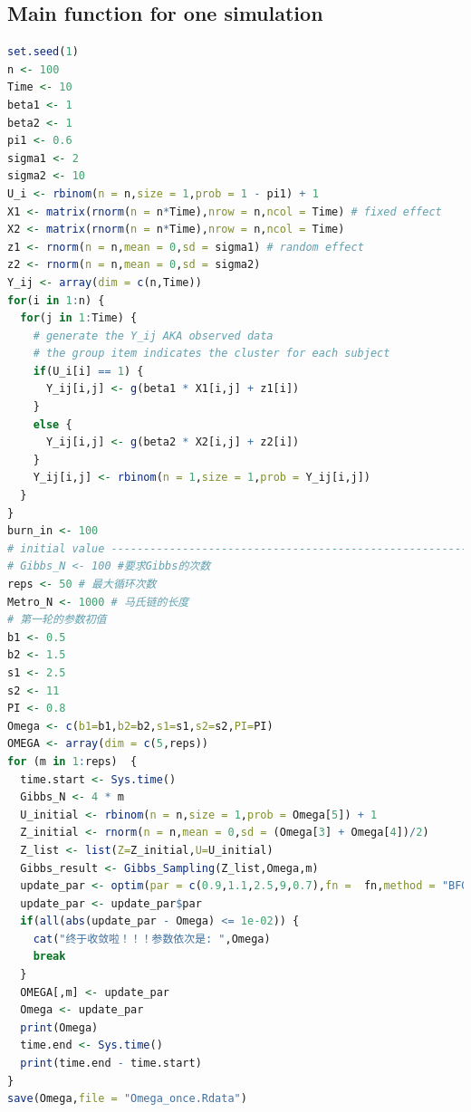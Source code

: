 \documentclass[11pt]{article}
\begin{document}
\subsection{Main function for one simulation}
  \begin{lstlisting}[language=R] 
set.seed(1)
n <- 100
Time <- 10
beta1 <- 1
beta2 <- 1
pi1 <- 0.6
sigma1 <- 2
sigma2 <- 10
U_i <- rbinom(n = n,size = 1,prob = 1 - pi1) + 1
X1 <- matrix(rnorm(n = n*Time),nrow = n,ncol = Time) # fixed effect
X2 <- matrix(rnorm(n = n*Time),nrow = n,ncol = Time)
z1 <- rnorm(n = n,mean = 0,sd = sigma1) # random effect
z2 <- rnorm(n = n,mean = 0,sd = sigma2)
Y_ij <- array(dim = c(n,Time))
for(i in 1:n) {
  for(j in 1:Time) {
    # generate the Y_ij AKA observed data
    # the group item indicates the cluster for each subject
    if(U_i[i] == 1) {
      Y_ij[i,j] <- g(beta1 * X1[i,j] + z1[i])
    }
    else {
      Y_ij[i,j] <- g(beta2 * X2[i,j] + z2[i])
    }
    Y_ij[i,j] <- rbinom(n = 1,size = 1,prob = Y_ij[i,j])
  }
}
burn_in <- 100
# initial value -----------------------------------------------------------
# Gibbs_N <- 100 #要求Gibbs的次数
reps <- 50 # 最大循环次数
Metro_N <- 1000 # 马氏链的长度
# 第一轮的参数初值
b1 <- 0.5
b2 <- 1.5
s1 <- 2.5
s2 <- 11
PI <- 0.8
Omega <- c(b1=b1,b2=b2,s1=s1,s2=s2,PI=PI)
OMEGA <- array(dim = c(5,reps))
for (m in 1:reps)  {
  time.start <- Sys.time()
  Gibbs_N <- 4 * m
  U_initial <- rbinom(n = n,size = 1,prob = Omega[5]) + 1
  Z_initial <- rnorm(n = n,mean = 0,sd = (Omega[3] + Omega[4])/2)
  Z_list <- list(Z=Z_initial,U=U_initial)
  Gibbs_result <- Gibbs_Sampling(Z_list,Omega,m) 
  update_par <- optim(par = c(0.9,1.1,2.5,9,0.7),fn =  fn,method = "BFGS",control = list(trace = 2))
  update_par <- update_par$par
  if(all(abs(update_par - Omega) <= 1e-02)) {
    cat("终于收敛啦！！！参数依次是: ",Omega)
    break
  }
  OMEGA[,m] <- update_par
  Omega <- update_par
  print(Omega)
  time.end <- Sys.time()
  print(time.end - time.start)
}
save(Omega,file = "Omega_once.Rdata")
  
  \end{lstlisting}
\end{document}
